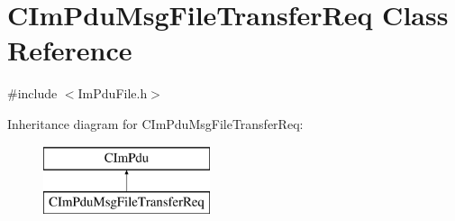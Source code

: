 \hypertarget{class_c_im_pdu_msg_file_transfer_req}{}\section{C\+Im\+Pdu\+Msg\+File\+Transfer\+Req Class Reference}
\label{class_c_im_pdu_msg_file_transfer_req}


{\ttfamily \#include $<$Im\+Pdu\+File.\+h$>$}

Inheritance diagram for C\+Im\+Pdu\+Msg\+File\+Transfer\+Req\+:\begin{figure}[H]
\begin{center}
\leavevmode
\includegraphics[height=2.000000cm]{class_c_im_pdu_msg_file_transfer_req}
\end{center}
\end{figure}
